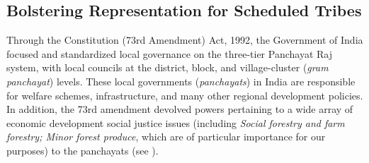 \documentclass[12pt,reqno]{article}
\begin{document}



\subsection{Bolstering Representation for Scheduled Tribes}

Through the Constitution (73rd Amendment) Act, 1992, the Government of India focused and standardized local governance on the three-tier Panchayat Raj system, with local councils at the district, block, and village-cluster ({\it gram panchayat}) levels. These local governments (\emph{panchayats}) in India are responsible for welfare schemes, infrastructure, and many other regional development policies. In addition, the 73rd amendment devolved powers pertaining to a wide array of economic development social justice issues (including \emph{Social forestry and farm forestry; Minor forest produce}, which are of particular importance for our purposes) to the panchayats (see \textcite{singh1994constitutional}). %
\end{document}
